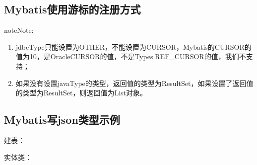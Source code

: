 \documentclass[a4,10pt,oneside,english]{sphinxmanual}
\begin{document}
\subsection{Mybatis使用游标的注册方式}
\label{\detokenize{interface/mybatis:id3}}
\begin{sphinxVerbatim}[commandchars=\\\{\}]
  
\end{sphinxVerbatim}

\begin{sphinxadmonition}{note}{Note:}\begin{enumerate}
%
\item {} 
jdbcType只能设置为OTHER，不能设置为CURSOR，Mybatis的CURSOR的值为\sphinxhyphen{}10，是OracleCURSOR的值，不是Types.REF\_CURSOR的值，我们不支持；

\item {} 
如果没有设置javaType的类型，返回值的类型为ResultSet，如果设置了返回值的类型为ResultSet，则返回值为List对象。

\end{enumerate}
\end{sphinxadmonition}


\subsection{Mybatis写json类型示例}
\label{\detokenize{interface/mybatis:mybatisjson}}
建表：

\begin{sphinxVerbatim}[commandchars=\\\{\}]
    
\end{sphinxVerbatim}

实体类：
\end{document}
